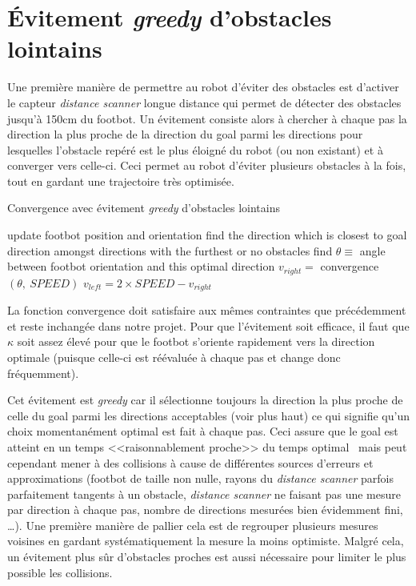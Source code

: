 \section{Évitement \emph{greedy} d'obstacles lointains}

Une première manière de permettre au robot d'éviter des obstacles est d'activer le capteur \emph{distance scanner} longue distance qui permet de détecter des obstacles jusqu'à 150cm du footbot. Un évitement consiste alors à chercher à chaque pas la direction la plus proche de la direction du goal parmi les directions pour lesquelles l'obstacle repéré est le plus éloigné du robot (ou non existant) et à converger vers celle-ci. Ceci permet au robot d'éviter plusieurs obstacles à la fois, tout en gardant une trajectoire très optimisée.

\begin{algorithm}
\caption{Convergence avec évitement \emph{greedy} d'obstacles lointains}
\label{greedyConvergence}
\begin{algorithmic}
    \STATE update footbot position and orientation
    \STATE find the direction which is closest to goal direction amongst directions with the furthest or no obstacles
    \STATE find \( \theta \equiv\) angle between footbot orientation and this optimal direction
    \STATE $v_{right}=$ convergence$(\theta,\:SPEED)$
    \STATE \( v_{left}= 2 \times SPEED-v_{right}\)
  \ENDWHILE
\end{algorithmic}
\end{algorithm}
La fonction convergence doit satisfaire aux mêmes contraintes que précédemment et reste inchangée dans notre projet. Pour que l'évitement soit efficace, il faut que $\kappa$ soit assez élevé pour que le footbot s'oriente rapidement vers la direction optimale (puisque celle-ci est réévaluée à chaque pas et change donc fréquemment).

Cet évitement est \emph{greedy} car il sélectionne toujours la direction la plus proche de celle du goal parmi les directions acceptables (voir plus haut) ce qui signifie qu'un choix momentanément optimal est fait à chaque pas. Ceci assure que le goal est atteint en un temps <<raisonnablement proche>> du temps optimal~\cite{mehlhorn_shortest_2008} mais peut cependant mener à des collisions à cause de différentes sources d'erreurs et approximations (footbot de taille non nulle, rayons du \emph{distance scanner} parfois parfaitement tangents à un obstacle, \emph{distance scanner} ne faisant pas une mesure par direction à chaque pas, nombre de directions mesurées bien évidemment fini, \ldots). Une première manière de pallier cela est de regrouper plusieurs mesures voisines en gardant systématiquement la mesure la moins optimiste. Malgré cela, un évitement plus sûr d'obstacles proches est aussi nécessaire pour limiter le plus possible les collisions.

